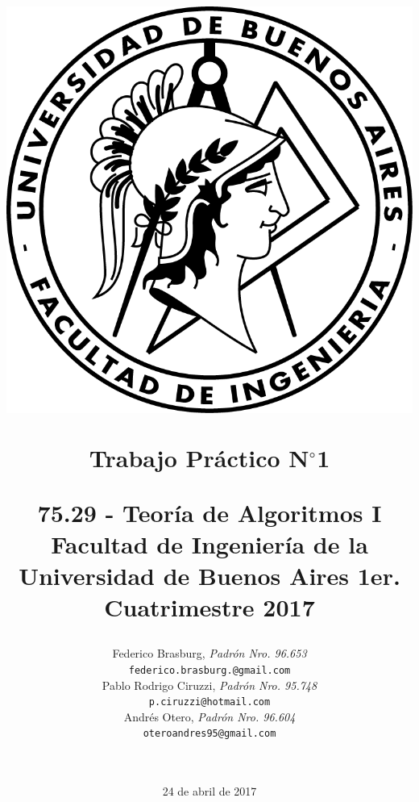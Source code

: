 \documentclass[a4paper,10pt]{article}
\begin{document}
\title{	
	\includegraphics[scale=0.8]{images/logo-fiuba.png} \\
	\begin{center}	
		\textbf{Trabajo Práctico N$^{\circ}$1} \linebreak
 	\end{center}
	\begin{center}
		\begin{large}
			75.29 - Teoría de Algoritmos I \linebreak
			Facultad de Ingeniería de la Universidad de Buenos Aires \linebreak
			1er. Cuatrimestre 2017 \linebreak
		\end{large}
	\end{center} 
}
\author{	Federico Brasburg, \textit{Padrón Nro. 96.653}                     \\
            \texttt{ federico.brasburg.@gmail.com }                                              \\[2.5ex]
            Pablo Rodrigo Ciruzzi, \textit{Padrón Nro. 95.748}                     \\
            \texttt{ p.ciruzzi@hotmail.com }                                              \\[2.5ex]
            Andrés Otero, \textit{Padrón Nro. 96.604 }                     \\
            \texttt{ oteroandres95@gmail.com }                                              \\[2.5ex] \\
            \\
       }
\date{24 de abril de 2017}
\end{document}

